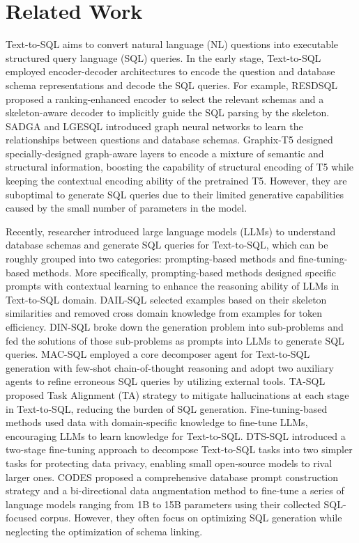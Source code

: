 \section{Related Work}
\label{sec2}
Text-to-SQL aims to convert natural language (NL) questions into executable structured query language (SQL) queries. In the early stage, Text-to-SQL employed encoder-decoder architectures to encode the question and database schema representations and decode the SQL queries. For example, RESDSQL \cite{ref2} proposed a ranking-enhanced encoder to select the relevant schemas and a skeleton-aware decoder to implicitly guide the SQL parsing by the skeleton. SADGA \cite{ref3} and LGESQL \cite{ref4} introduced graph neural networks to learn the relationships between questions and database schemas. Graphix-T5 \cite{ref5} designed specially-designed graph-aware layers to encode a mixture of semantic and structural information, boosting the capability of structural encoding of T5 while keeping the contextual encoding ability of the pretrained T5. However, they are suboptimal to generate SQL queries due to their limited generative capabilities caused by the small number of parameters in the model.

Recently, researcher introduced large language models (LLMs) to understand database schemas and generate SQL queries for Text-to-SQL, which can be roughly grouped into two categories: prompting-based methods and fine-tuning-based methods. More specifically, prompting-based methods designed specific prompts with contextual learning to enhance the reasoning ability of LLMs in Text-to-SQL domain. DAIL-SQL \cite{ref7} selected examples based on their skeleton similarities and removed cross domain knowledge from examples for token efficiency. DIN-SQL \cite{ref8} broke down the generation problem into sub-problems and fed the solutions of those sub-problems as prompts into LLMs to generate SQL queries. MAC-SQL \cite{ref9} employed a core decomposer agent for Text-to-SQL generation with few-shot chain-of-thought reasoning and adopt two auxiliary agents to refine erroneous SQL queries by utilizing external tools. TA-SQL \cite{ref10} proposed Task Alignment (TA) strategy to mitigate hallucinations at each stage in Text-to-SQL, reducing the burden of SQL generation. Fine-tuning-based methods used data with domain-specific knowledge to fine-tune LLMs, encouraging LLMs to learn knowledge for Text-to-SQL. DTS-SQL \cite{ref11} introduced a two-stage fine-tuning approach to decompose Text-to-SQL tasks into two simpler tasks for protecting data privacy, enabling small open-source models to rival larger ones. CODES \cite{ref12} proposed a comprehensive database prompt construction strategy and a bi-directional data augmentation method to fine-tune a series of language models ranging from 1B to 15B parameters using their collected SQL-focused corpus. However, they often focus on optimizing SQL generation while neglecting the optimization of schema linking.